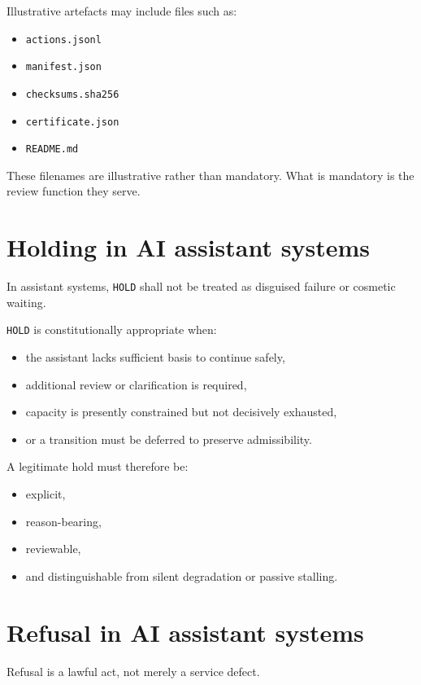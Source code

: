 \documentclass[11pt]{article}
\begin{document}
Illustrative artefacts may include files such as:
\begin{itemize}[leftmargin=2em]
    \item \texttt{actions.jsonl}
    \item \texttt{manifest.json}
    \item \texttt{checksums.sha256}
    \item \texttt{certificate.json}
    \item \texttt{README.md}
\end{itemize}

These filenames are illustrative rather than mandatory. What is mandatory is the review function they serve.

\section{Holding in AI assistant systems}

In assistant systems, \texttt{HOLD} shall not be treated as disguised failure or cosmetic waiting.

\texttt{HOLD} is constitutionally appropriate when:
\begin{itemize}[leftmargin=2em]
    \item the assistant lacks sufficient basis to continue safely,
    \item additional review or clarification is required,
    \item capacity is presently constrained but not decisively exhausted,
    \item or a transition must be deferred to preserve admissibility.
\end{itemize}

A legitimate hold must therefore be:
\begin{itemize}[leftmargin=2em]
    \item explicit,
    \item reason-bearing,
    \item reviewable,
    \item and distinguishable from silent degradation or passive stalling.
\end{itemize}

\section{Refusal in AI assistant systems}

Refusal is a lawful act, not merely a service defect.
\end{document}
